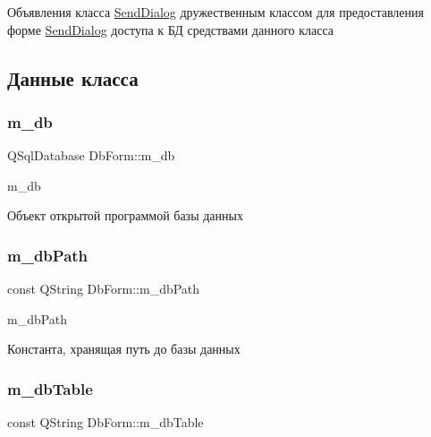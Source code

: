 Объявления класса \hyperlink{classSendDialog}{Send\+Dialog} дружественным классом для предоставления форме \hyperlink{classSendDialog}{Send\+Dialog} доступа к БД средствами данного класса 

\subsection{Данные класса}
\mbox{\label{classDbForm_a8baa011f5fa0625622b5930977ae8492}} 
\subsubsection{\texorpdfstring{m\+\_\+db}{m\_db}}
{\footnotesize\ttfamily Q\+Sql\+Database Db\+Form\+::m\+\_\+db\hspace{0.3cm}{\ttfamily [private]}}



m\+\_\+db 

Объект открытой программой базы данных \mbox{\label{classDbForm_a8db1268928d78d414fd354cbc08c92c8}} 
\subsubsection{\texorpdfstring{m\+\_\+db\+Path}{m\_dbPath}}
{\footnotesize\ttfamily const Q\+String Db\+Form\+::m\+\_\+db\+Path\hspace{0.3cm}{\ttfamily [private]}}



m\+\_\+db\+Path 

Константа, хранящая путь до базы данных \mbox{\label{classDbForm_a13a6b5d290951dfb001cfe34324c1634}} 
\subsubsection{\texorpdfstring{m\+\_\+db\+Table}{m\_dbTable}}
{\footnotesize\ttfamily const Q\+String Db\+Form\+::m\+\_\+db\+Table\hspace{0.3cm}{\ttfamily [private]}}



